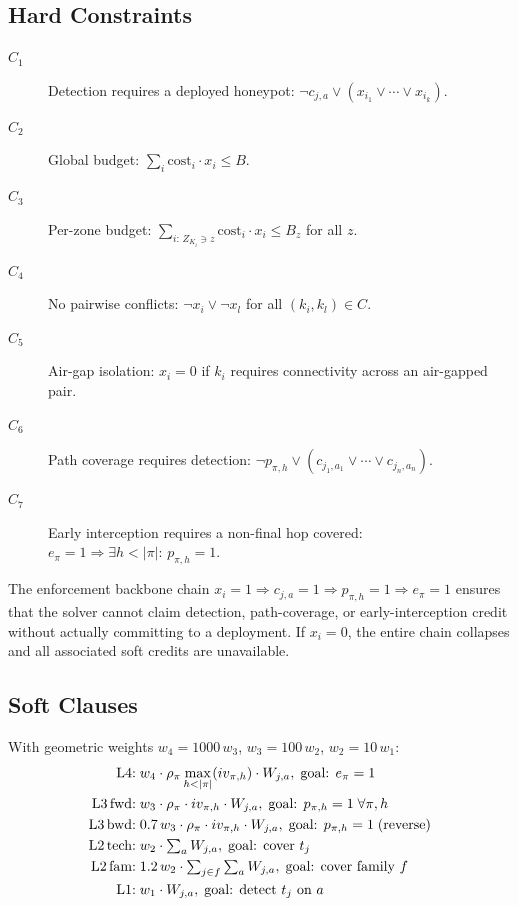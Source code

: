 \documentclass[journal]{IEEEtran}
\begin{document}
\subsection{Hard Constraints}
\label{sec:model:hard}

\begin{description}
  \item[$C_1$] Detection requires a deployed honeypot:
    $\neg c_{j,a}\vee(x_{i_1}\vee\cdots\vee x_{i_k})$.
  \item[$C_2$] Global budget:
    $\sum_i\mathrm{cost}_i\cdot x_i\leq B$.
  \item[$C_3$] Per-zone budget:
    $\sum_{i:\,Z_{K_i}\ni z}\mathrm{cost}_i\cdot x_i\leq B_z$
    for all $z$.
  \item[$C_4$] No pairwise conflicts:
    $\neg x_i\vee\neg x_l$ for all $(k_i,k_l)\in C$.
  \item[$C_5$] Air-gap isolation:
    $x_i=0$ if $k_i$ requires connectivity across an air-gapped pair.
  \item[$C_6$] Path coverage requires detection:
    $\neg p_{\pi,h}\vee(c_{j_1,a_1}\vee\cdots\vee c_{j_n,a_n})$.
  \item[$C_7$] Early interception requires a non-final hop covered:
    $e_\pi=1\Rightarrow\exists h<|\pi|:\,p_{\pi,h}=1$.
\end{description}

The enforcement backbone chain $x_i=1\Rightarrow c_{j,a}=1
\Rightarrow p_{\pi,h}=1\Rightarrow e_\pi=1$ ensures that the solver
cannot claim detection, path-coverage, or early-interception credit
without actually committing to a deployment. If $x_i=0$, the entire
chain collapses and all associated soft credits are unavailable.

\subsection{Soft Clauses}
\label{sec:model:soft}

With geometric weights $w_4=1000\,w_3$, $w_3=100\,w_2$,
$w_2=10\,w_1$:
\begin{align}
  \text{L4:}& \; w_4\cdot\rho_\pi
    \max_{h<|\pi|}(iv_{\pi,h})\cdot W_{j,a}, \;
    \text{goal: }e_\pi=1 \label{eq:L4}\\
  \text{L3\,fwd:}& \; w_3\cdot\rho_\pi\cdot iv_{\pi,h}
    \cdot W_{j,a}, \;
    \text{goal: }p_{\pi,h}=1\;\forall\pi,h \label{eq:L3f}\\
  \text{L3\,bwd:}& \; 0.7\,w_3\cdot\rho_\pi\cdot iv_{\pi,h}
    \cdot W_{j,a}, \;
    \text{goal: }p_{\pi,h}=1\;\text{(reverse)} \label{eq:L3b}\\
  \text{L2\,tech:}& \; w_2\cdot\textstyle\sum_a W_{j,a}, \;
    \text{goal: cover }t_j \label{eq:L2t}\\
  \text{L2\,fam:}& \; 1.2\,w_2\cdot
    \textstyle\sum_{j\in f}\sum_a W_{j,a}, \;
    \text{goal: cover family }f \label{eq:L2f}\\
  \text{L1:}& \; w_1\cdot W_{j,a}, \;
    \text{goal: detect }t_j\text{ on }a \label{eq:L1}
\end{align}
\end{document}
